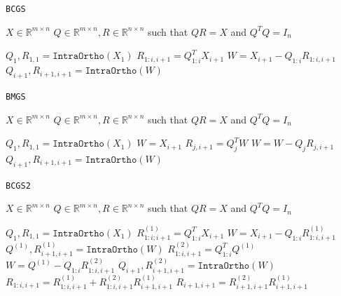 \begin{algorithm}
\caption{\texttt{BCGS}}\label{alg:bcgs}
\begin{algorithmic}[1]
\Require $X \in \mathbb{R}^{m\times n}$
\Ensure $ Q\in \mathbb{R}^{m\times n}, R \in \mathbb{R}^{n\times n}$ such that $QR = X$ and $Q^TQ=I_n$

\State $Q_1, R_{1,1} = \mathtt{IntraOrtho}(X_1)$
    \State $R_{1:i,i+1} = Q_{1:i}^T X_{i+1}$
    \State $W = X_{i+1} - Q_{1:i} R_{1:i,i+1}$
    \State $Q_{i+1}, R_{i+1,i+1} = \mathtt{IntraOrtho}(W)$
\EndFor
\end{algorithmic}
\end{algorithm}

\begin{algorithm}
\caption{\texttt{BMGS}}\label{alg:bmgs}
\begin{algorithmic}[1]
\Require $X \in \mathbb{R}^{m\times n}$
\Ensure $ Q\in \mathbb{R}^{m\times n}, R \in \mathbb{R}^{n\times n}$ such that $QR = X$ and $Q^TQ=I_n$

\State $Q_1, R_{1,1} = \mathtt{IntraOrtho}(X_1)$
    \State $W = X_{i+1}$
        \State $R_{j,i+1} = Q_{j}^T W$
        \State $W = W - Q_j R_{j,i+1}$
    \EndFor
    \State $Q_{i+1}, R_{i+1,i+1} = \mathtt{IntraOrtho}(W)$
\EndFor
\end{algorithmic}
\end{algorithm}


\begin{algorithm}
\caption{\texttt{BCGS2}}\label{alg:bcgs2}
\begin{algorithmic}[1]
\Require $X \in \mathbb{R}^{m\times n}$
\Ensure $ Q\in \mathbb{R}^{m\times n}, R \in \mathbb{R}^{n\times n}$ such that $QR = X$ and $Q^TQ=I_n$

\State $Q_1, R_{1,1} = \mathtt{IntraOrtho}(X_1)$
    \State $R_{1:i;i+1}^{(1)} = Q_{1:i}^T X_{i+1}$ 
    \State $W = X_{i+1} - Q_{1:i} R_{1:i,i+1}^{(1)}$
    \State $Q^{(1)}, R_{i+1,i+1}^{(1)} = \mathtt{IntraOrtho}(W)$
    \State $R_{1:i,i+1}^{(2)} = Q_{1:i}^T Q^{(1)}$ 
    \State $W = Q^{(1)} - Q_{1:i} R_{1:i,i+1}^{(2)}$
    \State $Q_{i+1}, R_{i+1,i+1}^{(2)} = \mathtt{IntraOrtho}(W)$
    \State $R_{1:i,i+1} = R_{1:i,i+1}^{(1)} + R_{1:i,i+1}^{(2)} R_{i+1,i+1}^{(1)}$
    \State $R_{i+1,i+1} = R_{i+1,i+1}^{(2)} R_{i+1,i+1}^{(1)}$
\EndFor
\end{algorithmic}
\end{algorithm}


